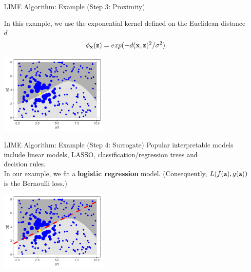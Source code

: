 \documentclass[11pt,compress,t,notes=noshow, aspectratio=169, xcolor=table]{beamer}
\begin{document}
\begin{frame}{LIME Algorithm: Example (Step 3: Proximity) }

	In this example, we use the exponential kernel defined on the Euclidean distance $d$
		 $$\neigh(\zv) = exp(-d(\xv, \zv)^2/\sigma^2).$$ 
		\begin{center}
			\includegraphics[width=0.4\textwidth]{figure/lime4}
		\end{center}
		
		
\end{frame}
		
\begin{frame}[c]{LIME Algorithm: Example (Step 4: Surrogate) }
		Popular interpretable models include linear models, LASSO, classification/regression trees and\\ decision rules.\\
		In our example, we fit a \textbf{logistic regression} model. (Consequently, $L(\fh(\zv), g(\zv))$ is the Bernoulli loss.)
		\begin{center}
			\includegraphics[width=0.4\textwidth]{figure/lime5}
		\end{center}
\end{frame}
\end{document}
